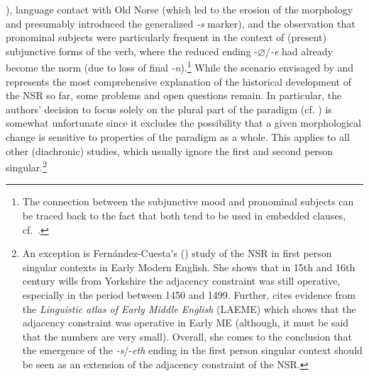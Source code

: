 \documentclass[output=paper]{langsci/langscibook}
\begin{document}
\citealt{Benskin2011}), language contact with Old Norse (which led to the
erosion of the  morphology and presumably introduced the generalized
\emph{-s} marker), and the observation that pronominal subjects were
particularly frequent in the context of (present) subjunctive forms of the
verb, where the reduced ending -$\varnothing$/\emph{-e} had already become the norm (due
to loss of final \emph{-n}).\footnote{The connection between the subjunctive
    mood and pronominal subjects can be traced back to the fact that both tend
to be used in embedded clauses, cf.\ \citet{deHaas:2011}.} While the
scenario envisaged by \textcite{deHaas:2011} and
\textcite{deHaasandvanKemenade:2015} represents the most comprehensive
explanation of the historical development of the \gls{NSR} so far, some
problems and open questions remain. In particular, the authors' decision to
focus solely on the plural part of the paradigm (cf.
\citealt[60]{deHaas:2011}) is somewhat unfortunate since it excludes the
possibility that a given morphological change is sensitive to properties of
the paradigm as a whole.  This applies to all other (diachronic) studies,
which usually ignore the first and second person singular.\footnote{An
    exception is Fernández-Cuesta's (\citeyear{Fernandez-Cuesta:2011})
    study of the \gls{NSR} in first person singular contexts in Early
    Modern English. She shows that in 15th and 16th century wills
    from Yorkshire the adjacency constraint was still operative, especially
    in the period between 1450 and 1499. Further,
    \citeauthor{Fernandez-Cuesta:2011} cites evidence from the
    \emph{Linguistic atlas of Early Middle English} (LAEME) which shows
    that the adjacency constraint was operative in Early \gls{ME} (although, it
    must be said that the numbers are very small). Overall, she comes to
    the conclusion that the emergence of the \emph{-s}/-\emph{eth} ending
    in the first person singular context should be seen as an extension of
the adjacency constraint of the \gls{NSR}.}
\end{document}
